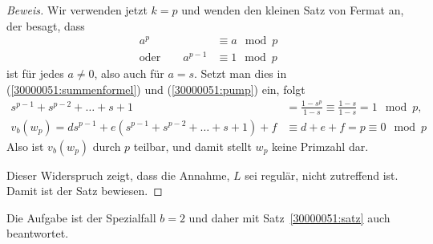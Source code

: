 \begin{loesung}
\begin{proof}[Beweis]
Wir verwenden jetzt $k=p$ und wenden den kleinen Satz von Fermat an,
der besagt, dass
\begin{align*}
a^p&\equiv a\mod p
\\
\text{oder}\qquad
a^{p-1}&\equiv 1\mod p
\end{align*}
ist für jedes $a\ne 0$, also auch für $a=s$.
Setzt man dies in (\ref{30000051:summenformel}) und (\ref{30000051:pump}) ein,
folgt
\begin{align*}
s^{p-1}+s^{p-2}+\dots+s+1
\phantom{)+f}
&=\frac{1-s^p}{1-s} \equiv \frac{1-s}{1-s}=1\mod p,
\\
v_b(w_p)
=
ds^{p-1} + e(s^{p-1}+s^{p-2}+\dots+s+1) + f
&\equiv
d+e+f = p\equiv 0 \mod p
\end{align*}
Also ist $v_b(w_p)$ durch $p$ teilbar, und damit stellt $w_p$ keine
Primzahl dar.

Dieser Widerspruch zeigt, dass die Annahme, $L$ sei regulär, nicht
zutreffend ist.
Damit ist der Satz bewiesen.
\renewcommand{\qedsymbol}{$\square$}
\end{proof}

Die Aufgabe ist der Spezialfall $b=2$ und daher mit Satz~\ref{30000051:satz}
auch beantwortet.
\end{loesung}
